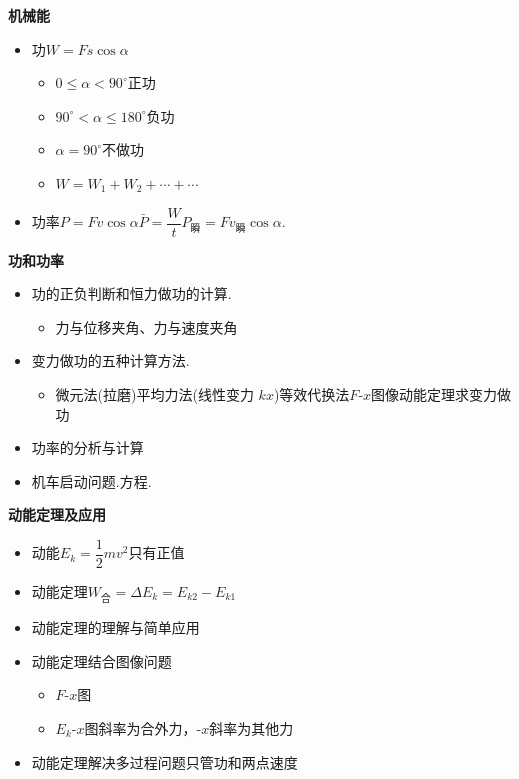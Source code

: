\textbf{机械能}
\begin{itemize}
\item 功\quad $W=Fs\cos\alpha$
  \begin{itemize}
  \item $0\le\alpha<90^\circ$\quad 正功
  \item $90^\circ<\alpha\le180^\circ$\quad 负功
  \item $\alpha=90^\circ$\quad 不做功
  \item $W=W_1+W_2+\cdots+\cdots$ %
  \end{itemize}
\item 功率\quad $P=Fv\cos\alpha$\qquad $\bar{P}=\dfrac{W}{t}$\qquad $P_{\text{瞬}}=Fv_{\text{瞬}}\cos\alpha$.
\end{itemize}
\textbf{功和功率}
\begin{itemize}
\item 功的正负判断和恒力做功的计算.
  \begin{itemize}
  \item 力与位移夹角、力与速度夹角
  \end{itemize}
\item 变力做功的五种计算方法.
  \begin{itemize}
  \item 微元法(拉磨)\quad 平均力法(线性变力 $kx$)\quad 等效代换法\quad $F$-$x$图像\quad 动能定理求变力做功 %
  \end{itemize}
\item 功率的分析与计算
\item 机车启动问题.\quad 方程.
\end{itemize}
\textbf{动能定理及应用}
\begin{itemize}
\item 动能\quad $E_k=\dfrac{1}{2}mv^2$\quad 只有正值
\item 动能定理\quad $W_{\text{合}}=\Delta E_k=E_{k2}-E_{k1}$
\item 动能定理的理解与简单应用
\item 动能定理结合图像问题
  \begin{itemize}
  \item $F$-$x$图 %
  \item $E_k$-$x$图斜率为合外力，$\text{-}x$斜率为其他力 %
  \end{itemize}
\item 动能定理解决多过程问题\quad 只管功和两点速度
\end{itemize}
